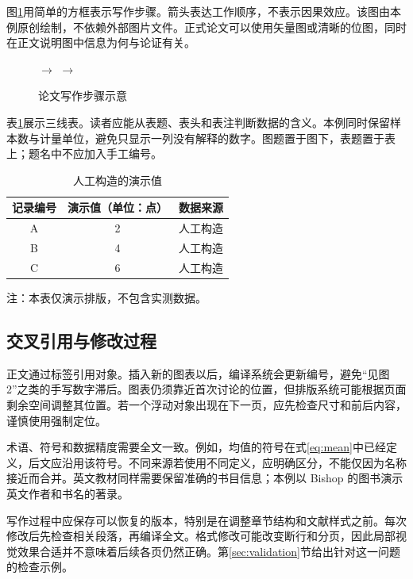 图\ref{fig:workflow}用简单的方框表示写作步骤。箭头表达工作顺序，不表示因果效应。该图由本例原创绘制，不依赖外部图片文件。正式论文可以使用矢量图或清晰的位图，同时在正文说明图中信息为何与论证有关。
\begin{figure}[htbp]
  \centering
  \setlength{\fboxsep}{7pt}
  \enspace$\longrightarrow$\enspace
  \enspace$\longrightarrow$\enspace
  \caption{论文写作步骤示意}
  \label{fig:workflow}
\end{figure}

表\ref{tab:synthetic}展示三线表。读者应能从表题、表头和表注判断数据的含义。本例同时保留样本数与计量单位，避免只显示一列没有解释的数字。图题置于图下，表题置于表上；题名中不应加入手工编号。
\begin{table}[htbp]
  \centering
  \caption{人工构造的演示值}
  \label{tab:synthetic}
  \begin{tabular}{ccc}
    \toprule
    记录编号 & 演示值（单位：点） & 数据来源 \\
    \midrule
    A & 2 & 人工构造 \\
    B & 4 & 人工构造 \\
    C & 6 & 人工构造 \\
    \bottomrule
  \end{tabular}
  \par\smallskip
  {注：本表仅演示排版，不包含实测数据。}
\end{table}

\subsection{交叉引用与修改过程}
正文通过标签引用对象。插入新的图表以后，编译系统会更新编号，避免“见图2”之类的手写数字滞后。图表仍须靠近首次讨论的位置，但排版系统可能根据页面剩余空间调整其位置。若一个浮动对象出现在下一页，应先检查尺寸和前后内容，谨慎使用强制定位。

术语、符号和数据精度需要全文一致。例如，均值的符号在式\eqref{eq:mean}中已经定义，后文应沿用该符号。不同来源若使用不同定义，应明确区分，不能仅因为名称接近而合并。英文教材同样需要保留准确的书目信息；本例以 Bishop 的图书演示英文作者和书名的著录。

写作过程中应保存可以恢复的版本，特别是在调整章节结构和文献样式之前。每次修改后先检查相关段落，再编译全文。格式修改可能改变断行和分页，因此局部视觉效果合适并不意味着后续各页仍然正确。第\ref{sec:validation}节给出针对这一问题的检查示例。
